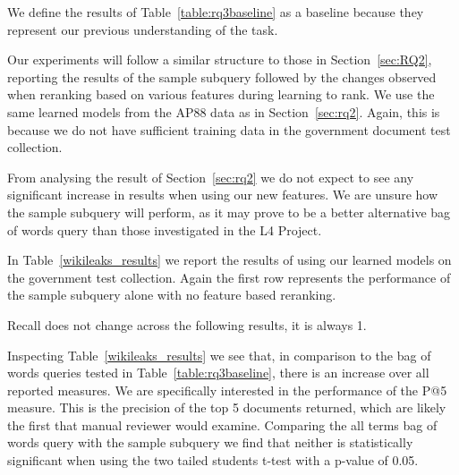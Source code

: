 \documentclass{mpaper}
\begin{document}
We define the results of Table~\ref{table:rq3baseline} as a baseline because they represent our previous understanding of the task.

Our experiments will follow a similar structure to those in Section~\ref{sec:RQ2}, reporting the results of the sample subquery followed by the changes observed when reranking based on various features during learning to rank. We use the same learned models from the AP88 data as in Section~\ref{sec:rq2}. Again, this is because we do not have sufficient training data in the government document test collection.

From analysing the result of Section~\ref{sec:rq2} we do not expect to see any significant increase in results when using our new features.
We are unsure how the sample subquery will perform, as it may prove to be a better alternative bag of words query than those investigated in the L4 Project.

In Table~\ref{wikileaks_results} we report the results of using our learned models on the government test collection. Again the first row represents the performance of the sample subquery alone with no feature based reranking.

Recall does not change across the following results, it is always 1.
\begin{center}
\begin{table}[H]
\centering
{}
\caption{Learning to Rank with Various Feature Combinations on Real Government Documents Collection}
\label{wikileaks_results}
\end{table}
\end{center}

Inspecting Table~\ref{wikileaks_results} we see that, in comparison to the bag of words queries tested in Table~\ref{table:rq3baseline}, there is an increase over all reported measures.
We are specifically interested in the performance of the P@5 measure. This is the precision of the top 5 documents returned, which are likely the first that manual reviewer would examine.
Comparing the all terms bag of words query with the sample subquery we find that neither is statistically significant when using the two tailed students t-test with a p-value of 0.05.
\end{document}
